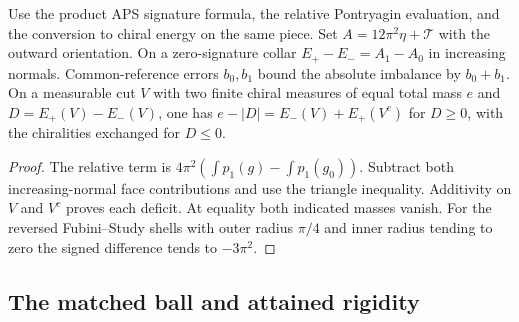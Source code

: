 \begin{proposition}
\label{prop:ed07-signed-collar}
\leanok
Use the product APS signature formula, the relative Pontryagin
evaluation, and the conversion to chiral energy on the same piece.
Set $A=12\pi^2\eta+\mathcal T$ with the outward orientation.
On a zero-signature collar $E_+-E_-=A_1-A_0$ in increasing normals.
Common-reference errors $b_0,b_1$ bound the absolute imbalance by
$b_0+b_1$. On a measurable cut $V$ with two finite chiral measures of
equal total mass $e$ and $D=E_+(V)-E_-(V)$, one has
$e-|D|=E_-(V)+E_+(V^c)$ for $D\ge0$, with the chiralities exchanged
for $D\le0$.
\end{proposition}
\begin{proof}
\leanok
The relative term is $4\pi^2(\int p_1(g)-\int p_1(g_0))$.
Subtract both increasing-normal face contributions and use the
triangle inequality. Additivity on $V$ and $V^c$ proves each deficit.
At equality both indicated masses vanish. For the reversed
Fubini--Study shells with outer radius $\pi/4$ and inner radius
tending to zero the signed difference tends to $-3\pi^2$.
\end{proof}

\subsection{The matched ball and attained rigidity}

